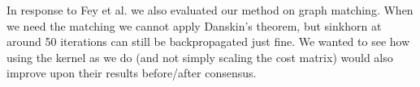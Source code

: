 
In response to Fey et al. we also evaluated our method on graph matching. When we need the matching we cannot apply Danskin's theorem, but sinkhorn at around 50 iterations can still be backpropagated just fine. We wanted to see how using the kernel as we do (and not simply scaling the cost matrix) would also improve upon their results before/after consensus.

